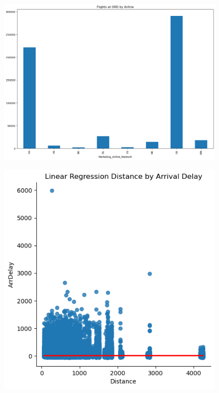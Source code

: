 \documentclass[a4paper,11pt]{article}
\begin{document}
\begin{figure}
    \centering
    \includegraphics*[scale=.40]{../../img/flights_by_airline.png}
    \caption[]{}
    \label{fig:flightsbyairline}
\end{figure}

\begin{figure}
    \centering
    \includegraphics*[scale=.40]{../../img/dist_by_delay.png}
    \caption[]{}
    \label{fig:lm_disbydelay}
\end{figure}
\end{document}
